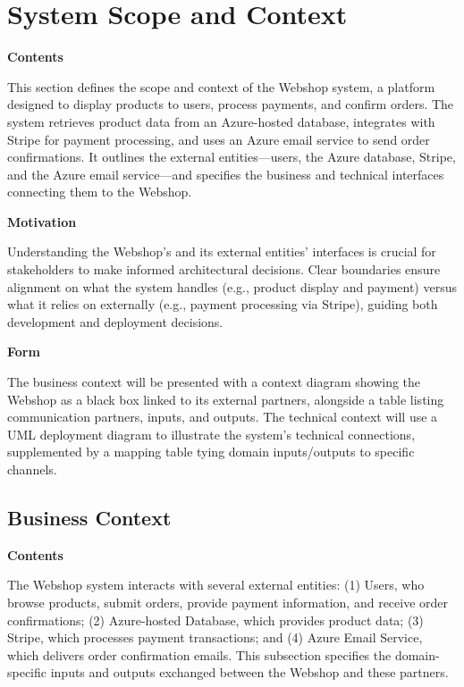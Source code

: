 \hypertarget{section-system-scope-and-context}{%
\section{System Scope and
Context}\label{section-system-scope-and-context}}

\textbf{Contents}

This section defines the scope and context of the Webshop system, a platform designed to display products to users, process payments, and confirm orders. The system retrieves product data from an Azure-hosted database, integrates with Stripe for payment processing, and uses an Azure email service to send order confirmations. It outlines the external entities—users, the Azure database, Stripe, and the Azure email service—and specifies the business and technical interfaces connecting them to the Webshop.

\textbf{Motivation}

Understanding the Webshop's and its external entities' interfaces is crucial for stakeholders to make informed architectural decisions. Clear boundaries ensure alignment on what the system handles (e.g., product display and payment) versus what it relies on externally (e.g., payment processing via Stripe), guiding both development and deployment decisions.

\textbf{Form}

The business context will be presented with a context diagram showing the Webshop as a black box linked to its external partners, alongside a table listing communication partners, inputs, and outputs. The technical context will use a UML deployment diagram to illustrate the system’s technical connections, supplemented by a mapping table tying domain inputs/outputs to specific channels.

\hypertarget{_business_context}{%
\subsection{Business Context}\label{_business_context}}

\textbf{Contents}

The Webshop system interacts with several external entities: (1) Users, who browse products, submit orders, provide payment information, and receive order confirmations; (2) Azure-hosted Database, which provides product data; (3) Stripe, which processes payment transactions; and (4) Azure Email Service, which delivers order confirmation emails. This subsection specifies the domain-specific inputs and outputs exchanged between the Webshop and these partners.

